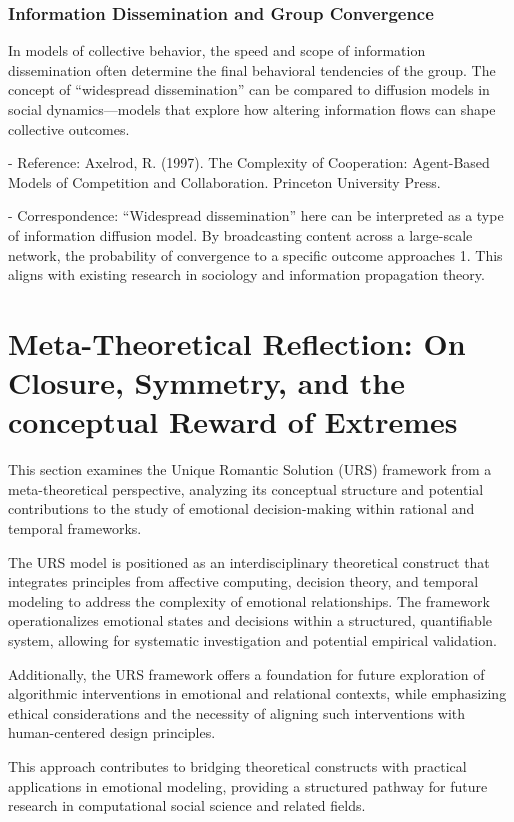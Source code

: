 \documentclass{article}
\begin{document}
\subsubsection{Information Dissemination and Group Convergence}

In models of collective behavior, the speed and scope of information dissemination often determine the final behavioral tendencies of the group. The concept of “widespread dissemination” can be compared to diffusion models in social dynamics—models that explore how altering information flows can shape collective outcomes.

- Reference: Axelrod, R. (1997). The Complexity of Cooperation: Agent-Based Models of Competition and Collaboration. Princeton University Press.

- Correspondence: “Widespread dissemination” here can be interpreted as a type of information diffusion model. By broadcasting content across a large-scale network, the probability of convergence to a specific outcome approaches 1. This aligns with existing research in sociology and information propagation theory.

\section{Meta-Theoretical Reflection: On Closure, Symmetry, and the conceptual Reward of Extremes}

This section examines the Unique Romantic Solution (URS) framework from a meta-theoretical perspective, analyzing its conceptual structure and potential contributions to the study of emotional decision-making within rational and temporal frameworks.

The URS model is positioned as an interdisciplinary theoretical construct that integrates principles from affective computing, decision theory, and temporal modeling to address the complexity of emotional relationships. The framework operationalizes emotional states and decisions within a structured, quantifiable system, allowing for systematic investigation and potential empirical validation.

Additionally, the URS framework offers a foundation for future exploration of algorithmic interventions in emotional and relational contexts, while emphasizing ethical considerations and the necessity of aligning such interventions with human-centered design principles.

This approach contributes to bridging theoretical constructs with practical applications in emotional modeling, providing a structured pathway for future research in computational social science and related fields.
\end{document}
